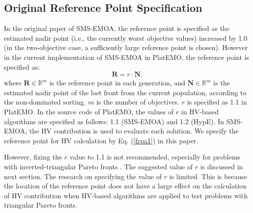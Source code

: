 \documentclass[conference]{IEEEtran}
\begin{document}
\subsection{Original Reference Point Specification}
In the original paper of SMS-EMOA\cite{smsemoa}, 
the reference point is specified as the estimated nadir point (i.e., the currently worst objective values) 
increased by 1.0
(in the two-objective case, a sufficiently large reference point is chosen). 
However in the current implementation of SMS-EMOA in PlatEMO\cite{PlatEMO}, the reference point is specified as:
\begin{equation}\label{frpa1}
  \boldsymbol R = r \cdot \boldsymbol N,  
\end{equation}
where $\boldsymbol R \in \mathbb{R}^m$ is the reference point in each generation, 
and $\boldsymbol N \in \mathbb{R}^m$ is the estimated nadir point of the last front from the current population, 
according to the non-dominated sorting. 
$m$ is the number of objectives. 
$r$ is specified as 1.1 in PlatEMO. 
In the source code of PlatEMO, the values of $r$ in HV-based algorithms are specified as follows: 
1.1 (SMS-EMOA\cite{smsemoa}) and 1.2 (HypE\cite{HypE}). %
In SMS-EMOA,  
the HV contribution is used to evaluate each solution. 
We specify the reference point for HV calculation by  Eq. (\ref{frpa1}) in this paper.

However, fixing the $r$ value to 1.1 is not recommended, especially for problems with inverted-triangular Pareto fronts
\cite{hisao:RPhowtoSpecify}. The suggested value of $r$ is discussed in next section. 
The research on specifying the value of $r$ is limited. 
This is because the location of the reference point does not have a large effect on the calculation of HV contribution 
when HV-based algorithms are applied to test problems with triangular Pareto fronts. 

%
\end{document}
